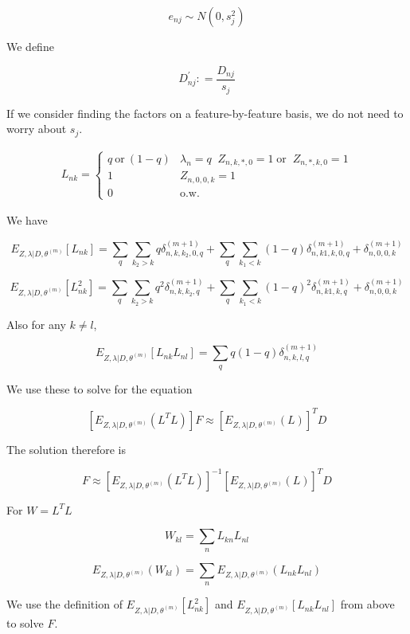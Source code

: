 \documentclass[11pt,authoryear]{article}
\begin{document}
$$ e_{nj} \sim N(0, s^2_{j}) $$

We define 

$$ D^{'}_{nj} : = \frac{D_{nj}}{s_{j}} $$

If we consider finding the factors on a feature-by-feature basis, we do not need to worry about $s_j$.

\begin{align*}
L_{nk} =
\begin{cases}
    q~\text{or}~(1-q) & \lambda_{n}=q  \; \; Z_{n,k,*, 0}=1 \; \text{or} \;\; Z_{n, *, k, 0} = 1 \\
    1 & Z_{n,0,0,k}=1 \\
    0 & \text{o.w.}
\end{cases}
\end{align*}

We have 

$$ E_{ Z, \lambda | D, \theta^{(m)}} \left [ L_{nk} \right ] = \sum_{q}  \sum_{k_2 > k} q \delta^{(m+1)}_{n, k, k_2, 0, q}  + \sum_{q}  \sum_{k_1 < k} (1-q) \delta^{(m+1)}_{n, k1, k, 0, q} +  \delta^{(m+1)}_{n, 0, 0, k} $$

$$ E_{ Z, \lambda | D, \theta^{(m)}} \left [ L^2_{nk} \right ] = \sum_{q}  \sum_{k_2 > k} q^2 \delta^{(m+1)}_{n,k,k_2, q}  + \sum_{q}  \sum_{k_1 < k} (1-q)^2 \delta^{(m+1)}_{n,k1,k,q} +  \delta^{(m+1)}_{n, 0, 0, k} $$

Also for any $k \neq l$,

$$ E_{ Z, \lambda | D, \theta^{(m)}} \left [ L_{nk}L_{nl} \right ] =
\sum_{q} q(1-q) \delta^{(m+1)}_{n,k,l,q} $$

We use these to solve for the equation

$$ \left [ E_{ Z, \lambda | D, \theta^{(m)}} \left( L^{T}L \right ) \right ] F \approx \left [ E_{ Z, \lambda | D, \theta^{(m)}} (L) \right] ^{T} D $$

The solution therefore is 

$$ F \approx \left [ E_{ Z, \lambda | D, \theta^{(m)}} \left( L^{T}L \right ) \right]^{-1} \left [ E_{ Z, \lambda | D, \theta^{(m)}} (L) \right]^{T} D $$

For $W = L^{T}L$

$$ W_{kl} = \sum_{n} L_{kn}L_{nl} $$

$$ E_{ Z, \lambda | D, \theta^{(m)}} \left ( W_{kl} \right ) = \sum_{n}  E_{ Z, \lambda | D, \theta^{(m)}} \left ( L_{nk}L_{nl} \right) $$

We use the definition of $E_{ Z, \lambda | D, \theta^{(m)}} \left [ L^2_{nk} \right ]$ 
and $E_{ Z, \lambda | D, \theta^{(m)}} \left [ L_{nk}L_{nl} \right ]$ 
from above to solve $F$. 
\end{document}
